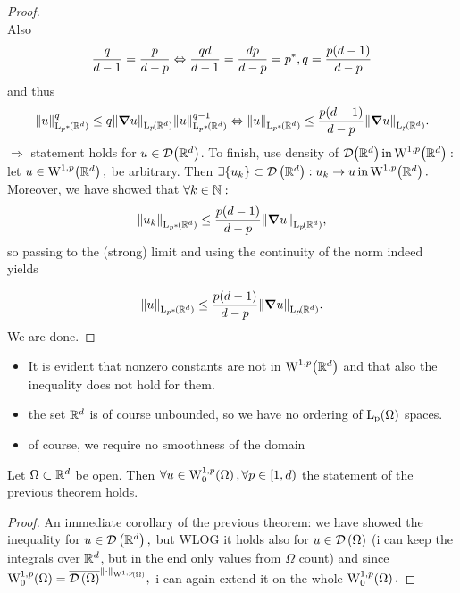 \documentclass{article}
\begin{document}
\begin{proof}
\[	\]
	Also
	\[
	\frac{q}{d-1} = \frac{p}{d-p} \Leftrightarrow \frac{qd}{d-1} = \frac{dp}{d-p} = p^{*},	q = \frac{p\qty(d-1)}{d-p}
	\]
	and thus
	\[
		\norm{u}_{\LpSet[p^{*}]{\R^{d}}}^q \leq q \norm{\grad u }_{\LpSet[p]{\R^{d}}} \norm{u}_{\LpSet[p^{*}]{\R^{d}}}^{q-1} \Leftrightarrow \norm{u}_{\LpSet[p^{*}]{\R^{d}}}\leq \frac{p\qty(d-1)}{d-p}\norm{\grad u}_{\LpSet[p]{\R^{d}}}.
	\]
	$\Rightarrow$ statement holds for $u \in \mathcal{D}\qty({\mathbb R}^d)$. To finish, use density of $\mathcal{D}\qty(\R^d) \, \text{in} \, \WkpSet[1][p]{\R^d}:$ let $u \in \WkpSet[1][p]{\R^{d}},$ be arbitrary. Then $\exists \qty{u_k} \subset \DSet{\R^{d}}: u_k \to u \, \text{in} \,\WkpSet[1][p]{\R^{d}}.$ Moreover, we have showed that $\forall k \in {\mathbb N}:$
	\[
		\norm{u_k}_{\LpSet[p^{*}]{\R^{d}}} \leq \frac{p\qty(d-1)}{d-p}\norm{\grad u}_{\LpSet[p]{\R^{d}}},
	\]
	so passing to the (strong) limit and using the continuity of the norm indeed yields

	\[
		\norm{u}_{\LpSet[p^{*}]{\R^{d}}} \leq \frac{p\qty(d-1)}{d-p}\norm{\grad u}_{\LpSet[p]{\R^{d}}}.
	\]
	We are done.


\end{proof}


\begin{remark}

	\begin{itemize}
		\item It is evident that nonzero constants are not in $\WkpSet[1][p]{\R^d}$ and that also the inequality does not hold for them.
		\item the set ${\mathbb R}^d$ is of course unbounded, so we have no ordering of $\LpSet{\Omega}$ spaces.
		\item of course, we require no smoothness of the domain
	\end{itemize}


\end{remark}

\begin{theorem}
	Let $\Omega \subset {\mathbb R}^d$ be open. Then $\forall u \in \WkpzeroSet[1][p]{\Omega}, \forall p \in [1,d)$ the statement of the previous theorem holds.
\end{theorem}
\begin{proof}
	An immediate corollary of the previous theorem: we have showed the inequality for $u \in \mathcal{D}\!\,\left({\mathbb R}^{d} \right),$ but WLOG it holds also for $u \in \mathcal{D}\!\,\left(\Omega \right)$ (i can keep the integrals over ${\mathbb R}^{d}$, but in the end only values from $\Omega$ count) and since $\WkpzeroSet[1][p]{\Omega} = \overline{\DSet{\Omega}}^{\norm{\vdot}_{\WkpSet[1][p]{\Omega}}},$ i can again extend it on the whole $\WkpzeroSet[1][p]{\Omega}.$
\end{proof}
\end{document}

